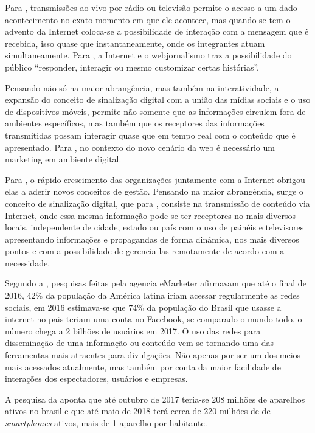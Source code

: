 Para \cite[p.4]{escobar2007}, transmissões ao vivo por rádio ou televisão permite o acesso a um dado acontecimento no exato momento em que ele acontece, mas quando se tem o advento da Internet coloca-se a possibilidade de interação com a mensagem que é recebida, isso quase que instantaneamente, onde os integrantes atuam simultaneamente. Para \cite{deuze2002}, a Internet e o webjornalismo traz a possibilidade do público ``responder, interagir ou mesmo customizar certas histórias''. 

Pensando não só na maior abrangência, mas também na interatividade, a expansão do conceito de sinalização digital com a união das mídias sociais e o uso de dispositivos móveis, permite não somente que as informações circulem fora de ambientes específicos, mas também que os receptores das informações transmitidas possam interagir quase que em tempo real com o conteúdo que é apresentado. Para \cite{santos2014}, no contexto do novo cenário da web é necessário um marketing em ambiente digital.

Para \cite[p.7]{machado2010}, o rápido crescimento das organizações juntamente com a Internet obrigou elas a aderir novos conceitos de gestão. Pensando na maior abrangência, surge o conceito de sinalização digital, que para \cite[p.37]{machado2010}, consiste na transmissão de conteúdo via Internet, onde essa mesma informação pode se ter receptores no mais diversos locais, independente de cidade, estado ou país com o uso de painéis e televisores apresentando informações e propagandas de forma dinâmica, nos mais diversos pontos e com a possibilidade de gerencia-las remotamente de acordo com a necessidade. 

Segundo a \cite{forbes2016}, pesquisas feitas pela agencia eMarketer afirmavam que até o final de 2016, 42\% da população da América latina iriam acessar regularmente as redes sociais, em 2016 estimava-se que 74\% da população do Brasil que usasse a internet no pais teriam uma conta no Facebook, se comparado o mundo todo, o número chega a 2 bilhões de usuários em 2017. O uso das redes para disseminação de uma informação ou conteúdo vem se tornando uma das ferramentas mais atraentes para divulgações. Não apenas por ser um dos meios mais acessados atualmente, mas também por conta da maior facilidade de interações dos espectadores, usuários e empresas. 

A pesquisa da \cite{fgv2017} aponta que até outubro de 2017 teria-se 208 milhões de aparelhos ativos no brasil e que até maio de 2018 terá cerca de 220 milhões de de \textit{smartphones} ativos, mais de 1 aparelho por habitante. 


